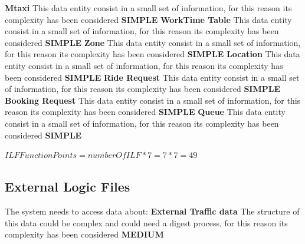 \documentclass[11pt,titlepage]{article} %
\begin{document}
     \noindent \textbf{Mtaxi}\newline
     This data entity consist in a small set of information, for this reason its complexity has been considered \textbf{SIMPLE}\newline\newline
     \textbf{WorkTime Table}\newline
     This data entity consist in a small set of information, for this reason its complexity has been considered \textbf{SIMPLE}\newline\newline
     \textbf{Zone}\newline
     This data entity consist in a small set of information, for this reason its complexity has been considered \textbf{SIMPLE}\newline\newline
     \textbf{Location}\newline
     This data entity consist in a small set of information, for this reason its complexity has been considered \textbf{SIMPLE}\newline\newline
     \textbf{Ride Request} 
     This data entity consist in a small set of information, for this reason its complexity has been considered \textbf{SIMPLE}\newline\newline
     \textbf{Booking Request}
     This data entity consist in a small set of information, for this reason its complexity has been considered \textbf{SIMPLE}\newline\newline
     \textbf{Queue}
     This data entity consist in a small set of information, for this reason its complexity has been considered \textbf{SIMPLE}\newline
     
     \begin{center}
      $ ILF Function Points = numberOfILF * 7 = 7 * 7 = 49 $
     \end{center}

   \subsection{External Logic Files}
    The system needs to access data about:\newline\newline
    \textbf{External Traffic data}\newline
    The structure of this data could be complex and could need a digest process, for this reason its complexity has been considered \textbf{MEDIUM}\newline
    
\end{document}
